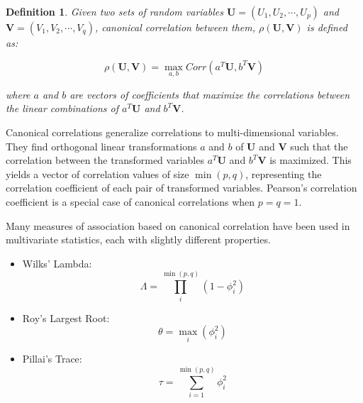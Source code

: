 \documentclass{uai2025} %
\newtheorem{definition}{Definition}
\begin{document}
\begin{definition} 

	Given two sets of random variables $ \bm{U} = (U_1, U_2, \cdots, U_p) $
	and $ \bm{V} = (V_1, V_2, \cdots, V_q) $, canonical correlation between
	them, $\rho(\bm{U}, \bm{V}) $ is defined as:
		

	\begin{equation}
		\rho(\bm{U}, \bm{V}) = \max_{a, b} Corr(a^T \bm{U}, b^T \bm{V})
	\end{equation}

	where $ a $ and $ b $ are vectors of coefficients that maximize the correlations
	between the linear combinations of $ a^T \bm{U} $ and $ b^T \bm{V} $.
\end{definition}

	
Canonical correlations generalize correlations to multi-dimensional variables. They
find orthogonal linear transformations $ a $ and $ b $ of $ \bm{U} $ and $ \bm{V} $
such that the correlation between the transformed variables $ a^T \bm{U} $ and 
$ b^T \bm{V} $ is maximized. This yields a vector of correlation values of 
size $ \min(p, q) $, representing the correlation coefficient of each pair of 
transformed variables. Pearson's correlation coefficient is a special case of 
canonical correlations when $ p = q = 1 $.

Many measures of association based on canonical correlation have been used in
multivariate statistics, each with slightly different properties.
\begin{itemize}
	\item Wilks' Lambda:
		$$ \Lambda = \prod_{i}^{\min(p, q)} (1 - \phi_i^2) $$
	\item Roy's Largest Root: 
		$$ \theta = \max_i(\phi_i^2) $$
	\item Pillai's Trace: 
		$$ \tau = \sum_{i=1}^{\min(p, q)} \phi_i^2 $$
\end{itemize}
\end{document}
